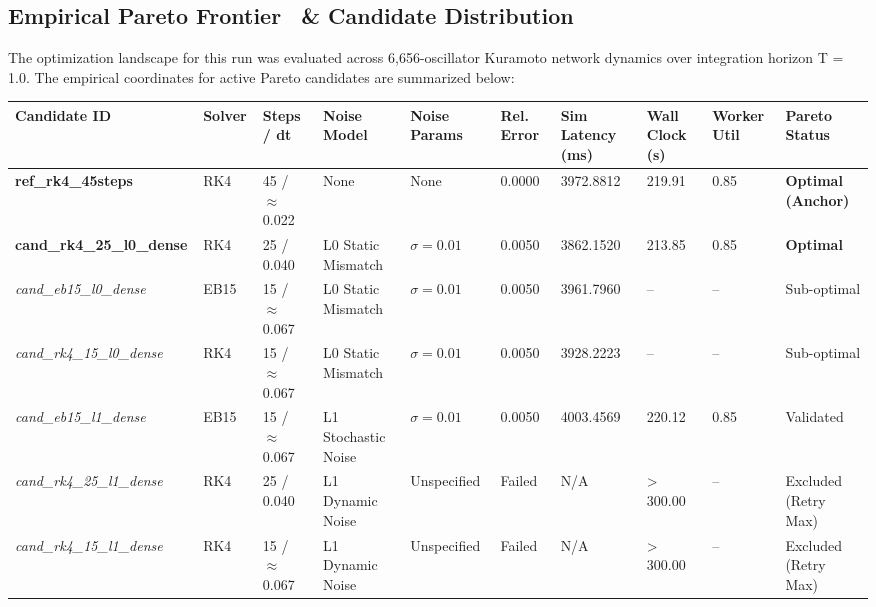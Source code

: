\documentclass[10pt,conference]{IEEEtran}
\begin{document}
\subsection{Empirical Pareto Frontier \ &  Candidate Distribution}

The optimization landscape for this run was evaluated across 6,656-oscillator Kuramoto network dynamics over integration horizon T = 1.0. The empirical coordinates for active Pareto candidates are summarized below:

\begin{tabular}{llllllllll}
\toprule
\textbf{Candidate ID} \ &  \textbf{Solver} \ &  \textbf{Steps / dt} \ &  \textbf{Noise Model} \ &  \textbf{Noise Params} \ &  \textbf{Rel. Error} \ &  \textbf{Sim Latency (ms)} \ &  \textbf{Wall Clock (s)} \ &  \textbf{Worker Util} \ &  \textbf{Pareto Status} \\
\midrule
\textbf{ref\_rk4\_45steps} \ &  RK4 \ &  45 / $\approx$0.022 \ &  None \ &  None \ &  0.0000 \ &  3972.8812 \ &  219.91 \ &  0.85 \ &  \textbf{Optimal (Anchor)} \\
\textbf{cand\_rk4\_25\_l0\_dense} \ &  RK4 \ &  25 / 0.040 \ &  L0 Static Mismatch \ &  $\sigma = 0.01$ \ &  0.0050 \ &  3862.1520 \ &  213.85 \ &  0.85 \ &  \textbf{Optimal} \\
\textit{cand\_eb15\_l0\_dense} \ &  EB15 \ &  15 / $\approx$0.067 \ &  L0 Static Mismatch \ &  $\sigma = 0.01$ \ &  0.0050 \ &  3961.7960 \ &  -- \ &  -- \ &  Sub-optimal \\
\textit{cand\_rk4\_15\_l0\_dense} \ &  RK4 \ &  15 / $\approx$0.067 \ &  L0 Static Mismatch \ &  $\sigma = 0.01$ \ &  0.0050 \ &  3928.2223 \ &  -- \ &  -- \ &  Sub-optimal \\
\textit{cand\_eb15\_l1\_dense} \ &  EB15 \ &  15 / $\approx$0.067 \ &  L1 Stochastic Noise \ &  $\sigma = 0.01$ \ &  0.0050 \ &  4003.4569 \ &  220.12 \ &  0.85 \ &  Validated \\
\textit{cand\_rk4\_25\_l1\_dense} \ &  RK4 \ &  25 / 0.040 \ &  L1 Dynamic Noise \ &  Unspecified \ &  Failed \ &  N/A \ &  > 300.00 \ &  -- \ &  Excluded (Retry Max) \\
\textit{cand\_rk4\_15\_l1\_dense} \ &  RK4 \ &  15 / $\approx$0.067 \ &  L1 Dynamic Noise \ &  Unspecified \ &  Failed \ &  N/A \ &  > 300.00 \ &  -- \ &  Excluded (Retry Max) \\
\bottomrule
\end{tabular}
\end{document}
